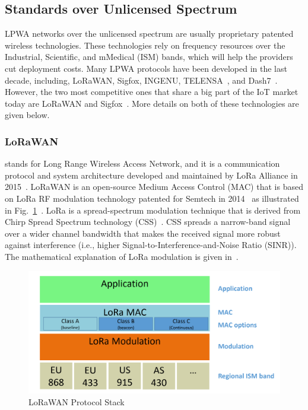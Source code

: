 \documentclass[]{IEEEtran}
\begin{document}
\subsection{Standards over Unlicensed Spectrum}
\label{sec:2-1}

LPWA networks over the unlicensed spectrum are usually proprietary patented wireless technologies.
These technologies rely on frequency resources over the Industrial, Scientific, and mMedical (ISM) bands, which will help the providers cut deployment costs.
Many LPWA protocols have been developed in the last decade, including, LoRaWAN, Sigfox\cite{ayoub2018internet}, INGENU\cite{ogbodo2022survey}, TELENSA~\cite{raza2017low}, and Dash7~\cite{augustin2016study}.
However, the two most competitive ones that share a big part of the IoT market today are LoRaWAN and Sigfox~\cite{ding_iot_2020}.
More details on both of these technologies are given below.

\subsubsection{LoRaWAN}
\label{sec:2-1-1}

stands for Long Range Wireless Access Network, and it is a communication protocol and system architecture developed and maintained by LoRa Alliance in 2015~\cite{LoRaWAN_spec}.
LoRaWAN is an open-source Medium Access Control (MAC) that is based on LoRa RF modulation technology patented for Semtech in 2014~\cite{seller_low_2016} as illustrated in Fig.~\ref{fig:LoRaWAN-stack}~\cite{LoRaWAN_spec}.
LoRa is a spread-spectrum modulation technique that is derived from  Chirp Spread Spectrum technology (CSS)~\cite{sforza_communications_2013}.
CSS spreads a narrow-band signal over a wider channel bandwidth that makes the received signal more robust against interference (i.e., higher Signal-to-Interference-and-Noise Ratio (SINR)).
The mathematical explanation of LoRa modulation is given in~\cite{vangelista2017frequency}.

\begin{figure}
    \centering
        \includegraphics[width=\linewidth]{Pictures/LoRaWAN_stack.png}
    \caption{LoRaWAN Protocol Stack}
    \label{fig:LoRaWAN-stack}
\end{figure}
\end{document}
